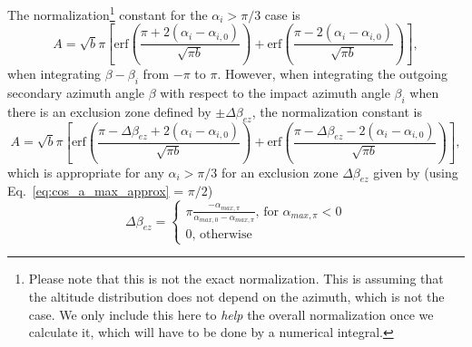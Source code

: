 \documentclass{hitec}
\numberwithin{equation}{section}
\begin{document}
The normalization\footnote{Please note that this is not the exact normalization. This is assuming that the altitude distribution does not depend on the azimuth, which is not the case. We only include this here to \textit{help} the overall normalization once we calculate it, which will have to be done by a numerical integral.} constant for the $\alpha_i > \pi/3$ case is
\begin{equation}
A = \sqrt{b}\pi\left[ \text{erf}\left(\frac{\pi + 2(\alpha_i-\alpha_{i,0})}{\sqrt{\pi b}}\right) + \text{erf}\left(\frac{\pi - 2(\alpha_i-\alpha_{i,0})}{\sqrt{\pi b}}\right) \right],
\end{equation}
when integrating $\beta-\beta_i$ from $-\pi$ to $\pi$. However, when integrating
the outgoing secondary azimuth angle $\beta$ with respect to the impact azimuth angle $\beta_i$ when there is an exclusion zone defined by $\pm\Delta\beta_{ez}$, the normalization constant is
\begin{equation}
A = \sqrt{b}\pi\left[ \text{erf}\left(\frac{\pi - \Delta\beta_{ez} + 2(\alpha_i-\alpha_{i,0})}{\sqrt{\pi b}}\right) + \text{erf}\left(\frac{\pi - \Delta\beta_{ez} - 2(\alpha_i-\alpha_{i,0})}{\sqrt{\pi b}}\right) \right],
\end{equation}
which is appropriate for any $\alpha_i > \pi/3$ for an exclusion zone $\Delta\beta_{ez}$ given by (using Eq.~\eqref{eq:cos_a_max_approx} = $\pi/2$)
\begin{equation}\label{eq:delta_beta_ez}
\Delta\beta_{ez} =
\begin{cases}
\pi\frac{-\alpha_{max,\pi}}{\alpha_{max,0}-\alpha_{max,\pi}} \text{, for $\alpha_{max,\pi} < 0$}\\
0 \text{, otherwise} 
\end{cases}
\end{equation}
\end{document}
